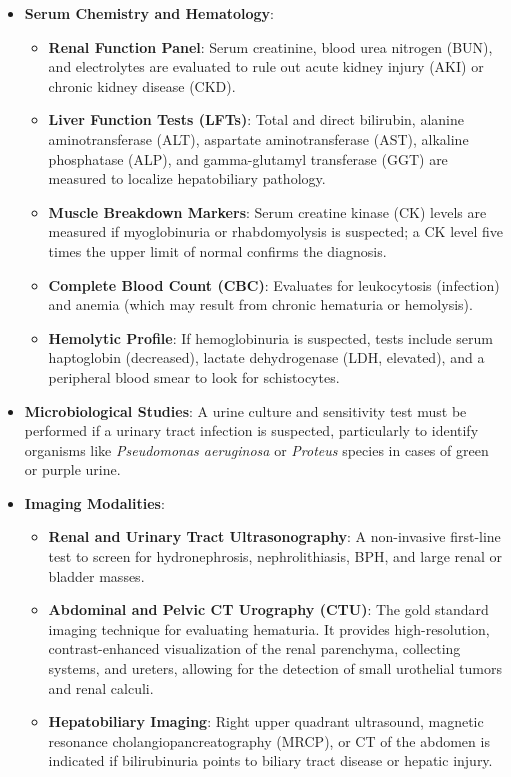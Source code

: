 \begin{itemize}
  \item \textbf{Serum Chemistry and Hematology}:
  \begin{itemize}
    \item \textbf{Renal Function Panel}: Serum creatinine, blood urea nitrogen (BUN), and electrolytes are evaluated to rule out acute kidney injury (AKI) or chronic kidney disease (CKD).
    \item \textbf{Liver Function Tests (LFTs)}: Total and direct bilirubin, alanine aminotransferase (ALT), aspartate aminotransferase (AST), alkaline phosphatase (ALP), and gamma-glutamyl transferase (GGT) are measured to localize hepatobiliary pathology.
    \item \textbf{Muscle Breakdown Markers}: Serum creatine kinase (CK) levels are measured if myoglobinuria or rhabdomyolysis is suspected; a CK level five times the upper limit of normal confirms the diagnosis.
    \item \textbf{Complete Blood Count (CBC)}: Evaluates for leukocytosis (infection) and anemia (which may result from chronic hematuria or hemolysis).
    \item \textbf{Hemolytic Profile}: If hemoglobinuria is suspected, tests include serum haptoglobin (decreased), lactate dehydrogenase (LDH, elevated), and a peripheral blood smear to look for schistocytes.
  \end{itemize}

  \item \textbf{Microbiological Studies}: A urine culture and sensitivity test must be performed if a urinary tract infection is suspected, particularly to identify organisms like \textit{Pseudomonas aeruginosa} or \textit{Proteus} species in cases of green or purple urine.

  \item \textbf{Imaging Modalities}:
  \begin{itemize}
    \item \textbf{Renal and Urinary Tract Ultrasonography}: A non-invasive first-line test to screen for hydronephrosis, nephrolithiasis, BPH, and large renal or bladder masses.
    \item \textbf{Abdominal and Pelvic CT Urography (CTU)}: The gold standard imaging technique for evaluating hematuria. It provides high-resolution, contrast-enhanced visualization of the renal parenchyma, collecting systems, and ureters, allowing for the detection of small urothelial tumors and renal calculi.
    \item \textbf{Hepatobiliary Imaging}: Right upper quadrant ultrasound, magnetic resonance cholangiopancreatography (MRCP), or CT of the abdomen is indicated if bilirubinuria points to biliary tract disease or hepatic injury.
  \end{itemize}


\end{itemize}
